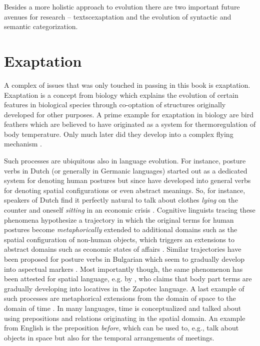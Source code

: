 Besides a more holistic approach to evolution there are two 
important future avenues for research -- textsc{exaptation} and the
evolution of syntactic and semantic categorization.

\section{Exaptation}
A complex of issues that was only touched in passing in this book
is exaptation. Exaptation is a concept from biology 
\citep{gould1979spandrels,gould1982exaptation,gould1991exaptation} 
which explains the evolution
of certain features in biological species through co-optation of 
structures originally developed for other purposes. A prime example
for exaptation in biology are bird feathers which are believed to have originated
as a system for thermoregulation of body temperature. Only much later
did they develop into a complex flying mechanism \citep{ostrom1974archaeopteryx,zhou2004origins}. 

Such processes are ubiquitous also in language evolution. For instance,
posture verbs in Dutch (or generally in Germanic languages) started out 
as a dedicated system for denoting human postures but since have 
developed into general verbs for denoting spatial configurations or even abstract 
meanings. So, for instance, speakers of Dutch find it perfectly natural to talk 
about clothes \emph{lying} on the counter and oneself \emph{sitting} in an 
economic crisis 
\citep{lemmens2002semantic,lemmens2004metaphor,spranger2009semantics,steels2009space}. Cognitive linguists tracing these 
phenomena hypothesize a trajectory in which the original terms 
for human postures become \emph{metaphorically} 
extended to additional domains such as the spatial configuration of 
non-human objects, which triggers an extensions to abstract 
domains such as economic states of affairs \citep{lemmens2004metaphor}. 
Similar trajectories have been proposed for posture verbs in Bulgarian 
which seem to gradually develop into aspectual markers \citep{kuteva1999sit}.
Most importantly though, the same phenomenon has been attested for 
spatial language, e.g. by \cite{maclaury1989zapotec}, who claims that 
body part terms are gradually developing
into locatives in the Zapotec language. A last example of such processes
are metaphorical extensions from the domain of space to the domain of time 
\citep{boroditsky2000metaphoric,tenbrink2011reference}. In many languages, 
time is conceptualized and talked about using prepositions and relations originating in the spatial domain. An example from English is the preposition \textit{before}, 
which can be used to, e.g., talk about 
objects in space but also for the temporal arrangements of meetings.

